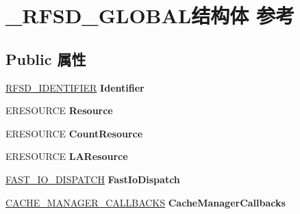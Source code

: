\hypertarget{struct___r_f_s_d___g_l_o_b_a_l}{}\section{\+\_\+\+R\+F\+S\+D\+\_\+\+G\+L\+O\+B\+A\+L结构体 参考}
\label{struct___r_f_s_d___g_l_o_b_a_l}
\subsection*{Public 属性}
\begin{DoxyCompactItemize}
\item 
\mbox{\label{struct___r_f_s_d___g_l_o_b_a_l_aad71545599fcb0863d71391126979ba1}} 
\hyperlink{struct___r_f_s_d___i_d_e_n_t_i_f_i_e_r}{R\+F\+S\+D\+\_\+\+I\+D\+E\+N\+T\+I\+F\+I\+ER} {\bfseries Identifier}
\item 
\mbox{\label{struct___r_f_s_d___g_l_o_b_a_l_aee325a70e36f16b5fdc5c5d92c0e8d52}} 
E\+R\+E\+S\+O\+U\+R\+CE {\bfseries Resource}
\item 
\mbox{\label{struct___r_f_s_d___g_l_o_b_a_l_ae04b66063f212cf0bac875fc25da04b1}} 
E\+R\+E\+S\+O\+U\+R\+CE {\bfseries Count\+Resource}
\item 
\mbox{\label{struct___r_f_s_d___g_l_o_b_a_l_ada9926b911fc7e448bd8d994abc56e8e}} 
E\+R\+E\+S\+O\+U\+R\+CE {\bfseries L\+A\+Resource}
\item 
\mbox{\label{struct___r_f_s_d___g_l_o_b_a_l_a31a850a627f6e4e32992b5882cddc540}} 
\hyperlink{struct___f_a_s_t___i_o___d_i_s_p_a_t_c_h}{F\+A\+S\+T\+\_\+\+I\+O\+\_\+\+D\+I\+S\+P\+A\+T\+CH} {\bfseries Fast\+Io\+Dispatch}
\item 
\mbox{\label{struct___r_f_s_d___g_l_o_b_a_l_a7e4b0d339ae9a656473fe432e3f110b3}} 
\hyperlink{struct___c_a_c_h_e___m_a_n_a_g_e_r___c_a_l_l_b_a_c_k_s}{C\+A\+C\+H\+E\+\_\+\+M\+A\+N\+A\+G\+E\+R\+\_\+\+C\+A\+L\+L\+B\+A\+C\+KS} {\bfseries Cache\+Manager\+Callbacks}
\item 
\mbox{\label{struct___r_f_s_d___g_l_o_b_a_l_a2725269be784c74aaf18b95bb2fe4c53}} 

\end{DoxyCompactItemize}
